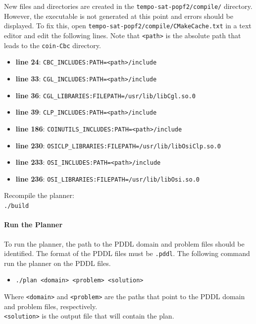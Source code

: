 New files and directories are created in the \texttt{tempo-sat-popf2/compile/} directory. However, the executable is not generated at this point and errors should be displayed. To fix this, open \texttt{tempo-sat-popf2/compile/CMakeCache.txt} in a text editor and edit the following lines. Note that \texttt{<path>} is the absolute path that leads to the \texttt{coin-Cbc} directory.


\begin{itemize}
\item \textbf{line 24}: \texttt{CBC\_INCLUDES:PATH=<path>/include}
\item \textbf{line 33}: \texttt{CGL\_INCLUDES:PATH=<path>/include}
\item \textbf{line 36}: \texttt{CGL\_LIBRARIES:FILEPATH=/usr/lib/libCgl.so.0}
\item \textbf{line 39}: \texttt{CLP\_INCLUDES:PATH=<path>/include}
\item \textbf{line 186}: \texttt{COINUTILS\_INCLUDES:PATH=<path>/include}
\item \textbf{line 230}: \texttt{OSICLP\_LIBRARIES:FILEPATH=/usr/lib/libOsiClp.so.0}
\item \textbf{line 233}: \texttt{OSI\_INCLUDES:PATH=<path>/include}
\item \textbf{line 236}: \texttt{OSI\_LIBRARIES:FILEPATH=/usr/lib/libOsi.so.0}
\end{itemize}

Recompile the planner:\\
\texttt{./build}


\paragraph{Run the Planner}
To run the planner, the path to the PDDL domain and problem files should be identified. The format of the PDDL files must be \texttt{.pddl}. The following command run the planner on the PDDL files.

\begin{itemize}
\item \texttt{./plan <domain> <problem> <solution>}
\end{itemize}


Where \texttt{<domain>} and \texttt{<problem>} are the paths that point to the PDDL domain and problem files, respectively.\\\texttt{<solution>} is the output file that will contain the plan.


